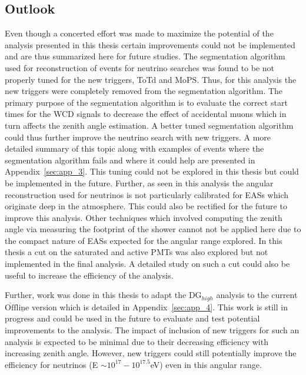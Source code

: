 \subsection*{Outlook}
Even though a concerted effort was made to maximize the potential of the analysis presented in this thesis certain improvements could not be implemented and are thus summarized here for future studies. The segmentation algorithm used for reconstruction of events for neutrino searches was found to be not properly tuned for the new triggers, ToTd and MoPS. Thus, for this analysis the new triggers were completely removed from the segmentation algorithm. The primary purpose of the segmentation algorithm is to evaluate the correct start times for the WCD signals to decrease the effect of accidental muons which in turn affects the zenith angle estimation. A better tuned segmentation algorithm could thus further improve the neutrino search with new triggers. A more detailed summary of this topic along with examples of events where the segmentation algorithm fails and where it could help are presented in Appendix~\ref{sec:app_3}. This tuning could not be explored in this thesis but could be implemented in the future. Further, as seen in this analysis the angular reconstruction used for neutrinos is not particularly calibrated for EASs which originate deep in the atmosphere. This could also be rectified for the future to improve this analysis. Other techniques which involved computing the zenith angle via measuring the footprint of the shower cannot not be applied here due to the compact nature of EASs expected for the angular range explored. In this thesis a cut on the saturated and active PMTs was also explored but not implemented in the final analysis. A detailed study on such a cut could also be useful to increase the efficiency of the analysis. 

Further, work was done in this thesis to adapt the DG$_{high}$ analysis to the current $\mathrm{\overline{Off} \underline{line}}$ version which is detailed in Appendix~\ref{sec:app_4}. This work is still in progress and could be used in the future to evaluate and test potential improvements to the analysis. The impact of inclusion of new triggers for such an analysis is expected to be minimal due to their decreasing efficiency with increasing zenith angle. However, new triggers could still potentially improve the efficiency for neutrinos (E $\sim 10^{17}-10^{17.5}$eV) even in this angular range. 

